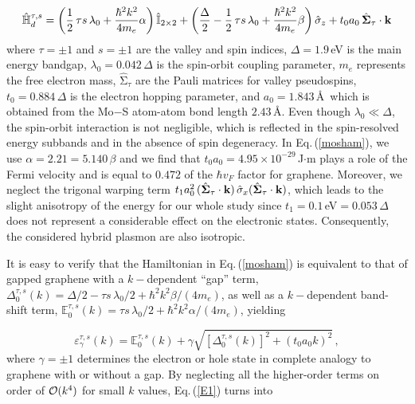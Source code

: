 \documentclass[aps,prb,showpacs]{revtex4}
\newcommand{\mbb}{\mathbb}
\begin{document}
\begin{equation}
\hat{\mbb{H}}_{d}^{\tau,s} = \left( 
\frac{1}{2}\,\tau s \, \lambda_0 + \frac{\hbar^2 k^2}{4 m_e} \alpha 
\right) \hat{\mbb{I}}_{2\times 2}
+
\left(
\frac{\Delta}{2} - \frac{1}{2}\,\tau s \, \lambda_0 + \frac{\hbar^2 k^2}{4 m_e} \beta 
\right) \hat{\sigma}_z + 
t_0a_0\,\hat{\boldsymbol{\mathrm{\Sigma}}}_\tau \cdot {\bf k}
\label{mosham}
\end{equation}
where $\tau=\pm 1$ and $s=\pm 1$ are the valley and spin indices, $\Delta = 1.9\,$eV is the main energy bandgap, $\lambda_0=0.042\,\Delta$ 
is the spin-orbit coupling parameter, $m_e$ represents the free electron mass, $\hat{\boldsymbol{\mathrm{\Sigma}}}_\tau$ are the Pauli matrices for valley pseudospins,
$t_0 = 0.884\,\Delta$ is the electron hopping parameter, and $a_0=1.843\,$\AA\ which is obtained from the Mo$-$S 
atom-atom bond length $2.43\,$\AA. Even though $\lambda_0 \ll \Delta$, the spin-orbit interaction is not negligible, which is reflected 
in the spin-resolved energy subbands and in the absence of spin degeneracy. 
In Eq.\,(\ref{mosham}), we use $\alpha =2.21 = 5.140\,\beta$ and we find that $t_0a_0= 4.95\times 10^{-29}\,$J$\cdot$m plays a role of the Fermi velocity
and is equal to $0.472$ of the $\hbar v_F$ factor for graphene.  
Moreover, we neglect the trigonal warping term $t_1 a_0^2\,(\hat{\boldsymbol{\mathrm{\Sigma}}}_\tau\cdot {\bf k})\,\hat{\sigma}_x(\hat{\boldsymbol{\mathrm{\Sigma}}}_\tau\cdot {\bf k})$, which leads to the 
slight anisotropy of the energy for our whole study since $t_1 = 0.1\,$eV$= 0.053\,\Delta$ does not represent a considerable effect
on the electronic states. Consequently, the considered hybrid plasmon are also isotropic. 
\medskip

It is easy to verify that the Hamiltonian in Eq.\,(\ref{mosham}) is equivalent to that of gapped graphene with a $k-$dependent ``gap'' term,
$\Delta_0^{\tau,s}(k) = \Delta / 2 - \tau s \, \lambda_0 / 2 + \hbar^2 k^2 \beta / (4 m_e)  $, as well as a $k-$dependent band-shift term, 
$\mbb{E}_0^{\tau,s}(k) = \tau s \, \lambda_0 / 2 + \hbar^2 k^2 \alpha /(4 m_e) $, yielding 

\begin{equation}
\varepsilon^{\tau,s}_{\gamma}(k) = \mbb{E}_0^{\tau,s}(k) + \gamma \sqrt{
\left[ \Delta_0^{\tau,s}(k) \right]^2 + (t_0 a_0 k)^2}\, ,
\label{E1}
\end{equation}
where $\gamma = \pm 1$ determines the electron or hole state in complete analogy to graphene with or without a gap. 
By neglecting all the higher-order terms on order of ${\cal O}(k^4)$ for small $k$ values, Eq.\,(\ref{E1}) turns into
\end{document}
